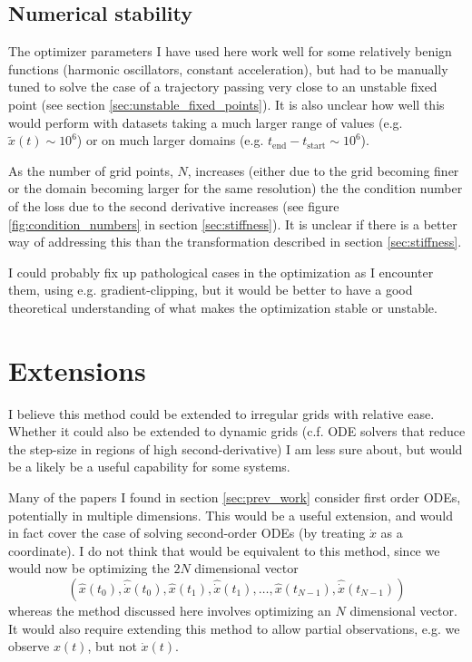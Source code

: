 \documentclass{article}
\begin{document}
\subsection{Numerical stability}
\label{sec:numerical_stability}

The optimizer parameters I have used here work well for some relatively benign functions (harmonic oscillators, constant acceleration), but had to be manually tuned to solve the case of a trajectory passing very close to an unstable fixed point (see section \ref{sec:unstable_fixed_points}).
It is also unclear how well this would perform with datasets taking a much larger range of values (e.g. $\tilde{x}(t) \sim 10^6$) or on much larger domains (e.g. $t_{\mathrm{end}} - t_{\mathrm{start}} \sim 10^6$).

As the number of grid points, $N$, increases (either due to the grid becoming finer or the domain becoming larger for the same resolution) the the condition number of the loss due to the second derivative increases (see figure \ref{fig:condition_numbers} in section \ref{sec:stiffness}).
It is unclear if there is a better way of addressing this than the transformation described in section \ref{sec:stiffness}.

I could probably fix up pathological cases in the optimization as I encounter them, using e.g. gradient-clipping, but it would be better to have a good theoretical understanding of what makes the optimization stable or unstable.

\section{Extensions}

I believe this method could be extended to irregular grids with relative ease.
Whether it could also be extended to dynamic grids (c.f. ODE solvers that reduce the step-size in regions of high second-derivative) I am less sure about, but would be a likely be a useful capability for some systems.

Many of the papers I found in section \ref{sec:prev_work} consider first order ODEs, potentially in multiple dimensions.
This would be a useful extension, and would in fact cover the case of solving second-order ODEs (by treating $\dot{x}$ as a coordinate).
I do not think that would be equivalent to this method, since we would now be optimizing the $2N$ dimensional vector
$$
\left( \hat{x}(t_0), \hat{\dot{x}}(t_0), \hat{x}(t_1), \hat{\dot{x}}(t_1), \dots, \hat{x}(t_{N-1}), \hat{\dot{x}}(t_{N-1}) \right)
$$
whereas the method discussed here involves optimizing an $N$ dimensional vector.
It would also require extending this method to allow partial observations, e.g. we observe $x(t)$, but not $\dot{x}(t)$.
\end{document}
